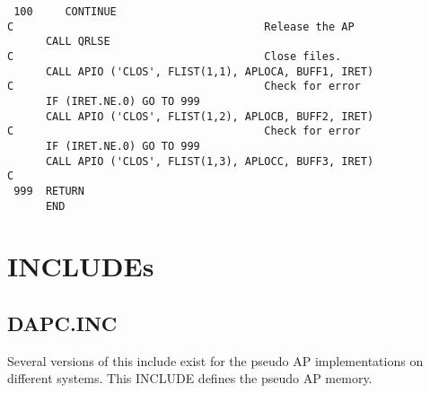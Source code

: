 \begin{verbatim}
 100     CONTINUE
C                                       Release the AP
      CALL QRLSE
C                                       Close files.
      CALL APIO ('CLOS', FLIST(1,1), APLOCA, BUFF1, IRET)
C                                       Check for error
      IF (IRET.NE.0) GO TO 999
      CALL APIO ('CLOS', FLIST(1,2), APLOCB, BUFF2, IRET)
C                                       Check for error
      IF (IRET.NE.0) GO TO 999
      CALL APIO ('CLOS', FLIST(1,3), APLOCC, BUFF3, IRET)
C
 999  RETURN
      END

\end{verbatim}

\section{INCLUDEs }
\subsection{DAPC.INC}
Several versions of this include exist for the pseudo AP
implementations on different systems.  This INCLUDE defines the pseudo
AP memory.

